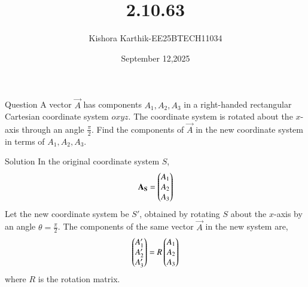 \documentclass{beamer}
\begin{document}
\title 
{2.10.63}
\date{September 12,2025}


\author 
{Kishora Karthik-EE25BTECH11034}
\frame{\titlepage}
\begin{frame}{Question}
A vector $\vec{A}$ has components $A_1, A_2, A_3$ in a right-handed rectangular Cartesian coordinate system $oxyz$. The coordinate system is rotated about the $x$-axis through an angle $\frac{\pi}{2}$. Find the components of $\vec{A}$ in the new coordinate system in terms of $A_1, A_2, A_3$.\\
\end{frame}



\begin{frame}{ Solution}
In the original coordinate system $S$,
\begin{align}
    \mathbf{A_S} = \begin{pmatrix} A_1 \\ A_2 \\ A_3\end{pmatrix}  
\end{align}
Let the new coordinate system be $S'$, obtained by rotating $S$ about the $x$-axis by an angle $\theta = \frac{\pi}{2}$. The components of the same vector $\vec{A}$ in the new system are,
\begin{align}
    \begin{pmatrix}A'_1 \\ A'_2 \\ A'_3\end{pmatrix}   = R \begin{pmatrix}A_1 \\ A_2 \\ A_3\end{pmatrix} 
\end{align}
where $R$ is the rotation matrix.
\end{frame}
\end{document}
